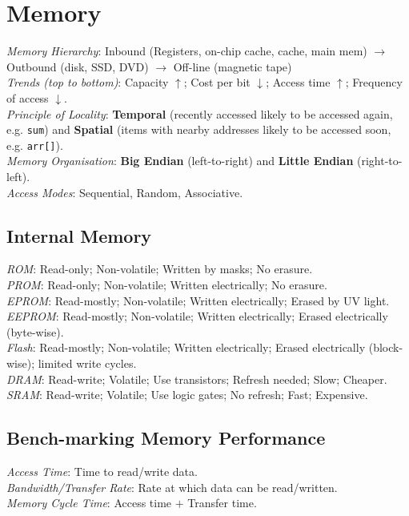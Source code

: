 \section{Memory}
\emph{Memory Hierarchy}: Inbound (Registers, on-chip cache, cache, main mem)
$\rightarrow$ Outbound (disk, SSD, DVD)
$\rightarrow$ Off-line (magnetic tape)\\
\emph{Trends (top to bottom)}: Capacity $\uparrow$; Cost per bit $\downarrow$;
Access time $\uparrow$; Frequency of access $\downarrow$.\\
\emph{Principle of Locality}:
\textbf{Temporal} (recently accessed likely to be accessed again, e.g. \texttt{sum}) and
\textbf{Spatial} (items with nearby addresses likely to be accessed soon, e.g. \texttt{arr[]}).\\
\emph{Memory Organisation}:
\textbf{Big Endian} (left-to-right) and \textbf{Little Endian} (right-to-left).\\
\emph{Access Modes}: Sequential, Random, Associative.

\subsection*{Internal Memory}
\emph{ROM}: Read-only; Non-volatile; Written by masks; No erasure.\\
\emph{PROM}: Read-only; Non-volatile; Written electrically; No erasure.\\
\emph{EPROM}: Read-mostly; Non-volatile; Written electrically; Erased by UV light.\\
\emph{EEPROM}: Read-mostly; Non-volatile; Written electrically; Erased electrically (byte-wise).\\
\emph{Flash}: Read-mostly; Non-volatile; Written electrically; Erased electrically (block-wise); limited write cycles.\\
\emph{DRAM}: Read-write; Volatile; Use transistors; Refresh needed; Slow; Cheaper.\\
\emph{SRAM}: Read-write; Volatile; Use logic gates; No refresh; Fast; Expensive.

\subsection*{Bench-marking Memory Performance}
\emph{Access Time}: Time to read/write data.\\
\emph{Bandwidth/Transfer Rate}: Rate at which data can be read/written.\\
\emph{Memory Cycle Time}: Access time $+$ Transfer time.

